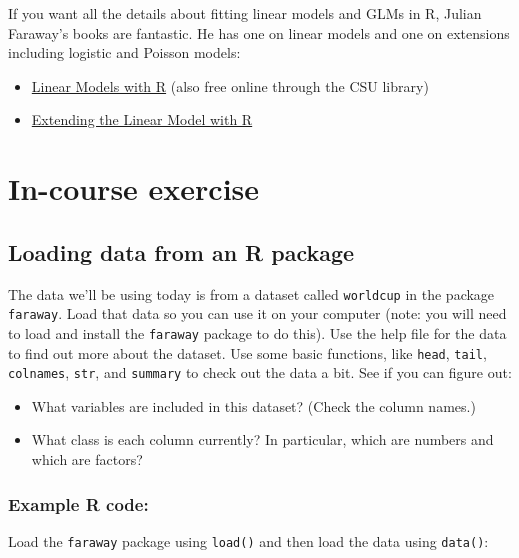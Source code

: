 \documentclass[]{book}
\providecommand{\tightlist}{%
  \setlength{\itemsep}{0pt}\setlength{\parskip}{0pt}}
\begin{document}
If you want all the details about fitting linear models and GLMs in R,
Julian Faraway's books are fantastic. He has one on linear models and
one on extensions including logistic and Poisson models:

\begin{itemize}
\tightlist
\item
  \href{http://discovery.library.colostate.edu/Record/.b41119691}{Linear
  Models with R} (also free online through the CSU library)
\item
  \href{http://www.amazon.com/Extending-Linear-Model-Generalized-Nonparametric/dp/158488424X/ref=sr_1_1?ie=UTF8\&qid=1442252668\&sr=8-1\&keywords=extending+linear+model+r}{Extending
  the Linear Model with R}
\end{itemize}

\section{In-course exercise}\label{in-course-exercise-2}

\subsection{Loading data from an R
package}\label{loading-data-from-an-r-package}

The data we'll be using today is from a dataset called \texttt{worldcup}
in the package \texttt{faraway}. Load that data so you can use it on
your computer (note: you will need to load and install the
\texttt{faraway} package to do this). Use the help file for the data to
find out more about the dataset. Use some basic functions, like
\texttt{head}, \texttt{tail}, \texttt{colnames}, \texttt{str}, and
\texttt{summary} to check out the data a bit. See if you can figure out:

\begin{itemize}
\tightlist
\item
  What variables are included in this dataset? (Check the column names.)
\item
  What class is each column currently? In particular, which are numbers
  and which are factors?
\end{itemize}

\subsubsection{Example R code:}\label{example-r-code}

Load the \texttt{faraway} package using \texttt{load()} and then load
the data using \texttt{data()}:
\end{document}
